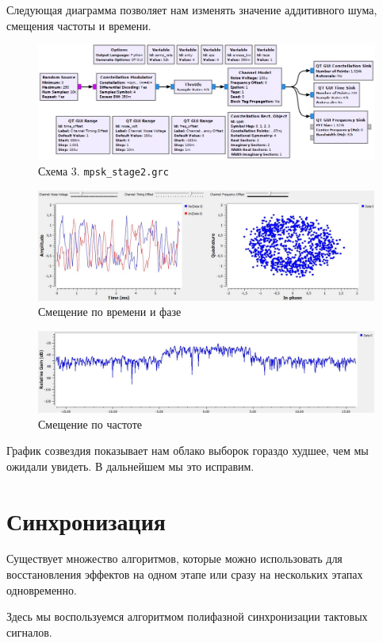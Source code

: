 \documentclass[a4paper, 12pt]{report}
\begin{document}
	Следующая диаграмма позволяет нам изменять значение аддитивного шума, смещения частоты и времени.
	\begin{figure}[H]
		\centering
		\includegraphics[width=1.0\textwidth]{7.jpg}
		\caption{Схема 3. \texttt{mpsk\_stage2.grc}}
		\label{fig:7}
	\end{figure}
	\begin{figure}[H]
		\centering
		\includegraphics[width=1.0\textwidth]{8.jpg}
		\caption{Смещение по времени и фазе}
		\label{fig:8}
	\end{figure}
	\begin{figure}[H]
		\centering
		\includegraphics[width=1.0\textwidth]{9.jpg}
		\caption{Смещение по частоте}
		\label{fig:9}
	\end{figure}
	График созвездия показывает нам облако выборок гораздо худшее, чем мы ожидали увидеть. В дальнейшем мы это исправим.
	
	\chapter{Синхронизация}
	Существует множество алгоритмов, которые можно использовать для восстановления эффектов на одном этапе или сразу на нескольких этапах одновременно. 
	
	Здесь мы воспользуемся алгоритмом полифазной синхронизации тактовых сигналов. 
	
\end{document}
